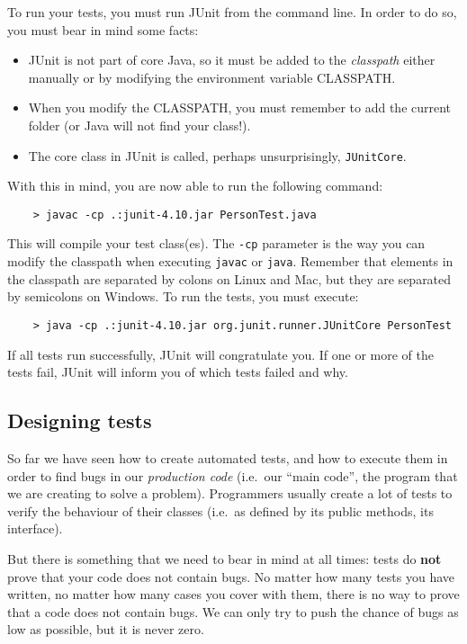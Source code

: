 To run your tests, you must run JUnit from the command line. In order
to do so, you must bear in mind some facts: 

\begin{itemize}
\item JUnit is not part of core Java, so it must be added to the
  \emph{classpath} either manually or by modifying the environment
  variable CLASSPATH.
\item When you modify the CLASSPATH, you must remember to add the
  current folder (or Java will not find your class!).
\item The core class in JUnit is called, perhaps unsurprisingly,
  \verb+JUnitCore+. 
\end{itemize}

With this in mind, you are now able to run the following
command: 

\begin{verbatim}
    > javac -cp .:junit-4.10.jar PersonTest.java
\end{verbatim}

This will compile your test class(es). The \verb+-cp+ parameter is the
way you can modify the classpath when executing \verb+javac+ or
\verb+java+. Remember that elements in the classpath are separated by
colons on Linux and Mac, but they are separated by semicolons on
Windows. To run the tests, you must execute:

\begin{verbatim}
    > java -cp .:junit-4.10.jar org.junit.runner.JUnitCore PersonTest
\end{verbatim}

If all tests run successfully, JUnit will congratulate you. If one or
more of the tests fail, JUnit will inform you of which tests failed
and why. 

\subsection{Designing tests}
\label{sec:designing-tests}

So far we have seen how to create automated tests, and how to execute
them in order to find bugs in our \emph{production code} (i.e.~our
``main code'', the program that we are creating to solve a
problem). Programmers usually create a lot of tests to verify the
behaviour of their classes (i.e.~as defined by its public methods, its
interface). 

But there is something that we need to bear in mind at all
times: tests do \textbf{not} prove that your code does not contain
bugs. No matter how many tests you have written, no matter how many
cases you cover with them, there is no way to prove that a code does
not contain bugs. We can only try to push the chance of bugs as low as
possible, but it is never zero.

